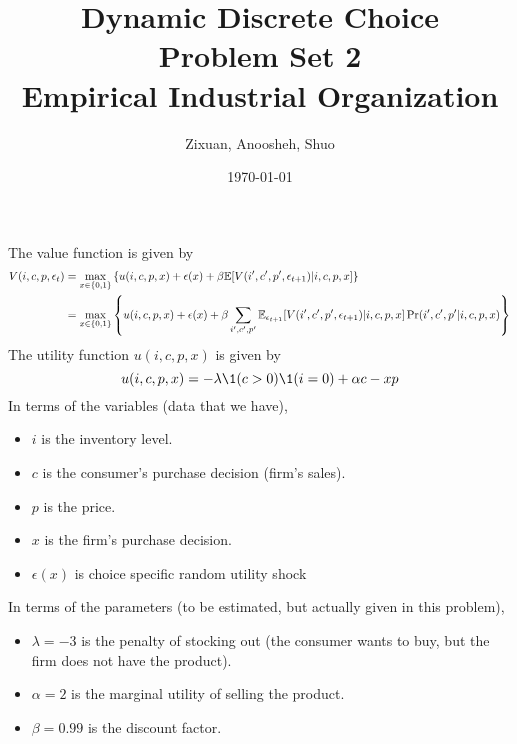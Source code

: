 \documentclass[12pt]{article}[margin=1in]
\title{\textbf{Dynamic Discrete Choice} \\
\vspace{.3cm}
\large Problem Set 2 \\
Empirical Industrial Organization}
\author{Zixuan, Anoosheh, Shuo}
\date{\today}
\begin{document}
\maketitle

\setcounter{page}{1}

The value function is given by
\begin{equation*}
    \begin{split}
        V(i,c,p,\epsilon_t) & = \max_{x \in \{0,1\}} \left\{ u(i,c,p,x) + \epsilon(x)+ \beta \mathbb{E}[V(i',c',p',\epsilon_{t+1})|i,c,p,x] \right\}                                                        \\
                            & = \max_{x \in \{0,1\}} \left\{ u(i,c,p,x) + \epsilon(x)+ \beta \sum_{i',c',p'}\mathbb{E}_{\epsilon_{t+1}}[V(i',c',p',\epsilon_{t+1})|i,c,p,x] \Pr(i', c',p'|i,c,p,x) \right\} \\
    \end{split}
\end{equation*}
The utility function $u(i,c,p,x)$ is given by
\begin{equation*}
    u(i,c,p,x) = -\lambda \1(c>0)\1(i=0) + \alpha c -xp
\end{equation*}
In terms of the variables (data that we have),
\begin{itemize}
    \item $i$ is the inventory level.
    \item $c$ is the consumer's purchase decision (firm's sales).
    \item $p$ is the price.
    \item $x$ is the firm's purchase decision.
    \item $\epsilon(x)$ is choice specific random utility shock
\end{itemize}
In terms of the parameters (to be estimated, but actually given in this problem),
\begin{itemize}
    \item $\lambda=-3$ is the penalty of stocking out (the consumer wants to buy, but the firm does not have the product).
    \item $\alpha=2$ is the marginal utility of selling the product.
    \item $\beta=0.99$ is the discount factor.
\end{itemize}
\end{document}
